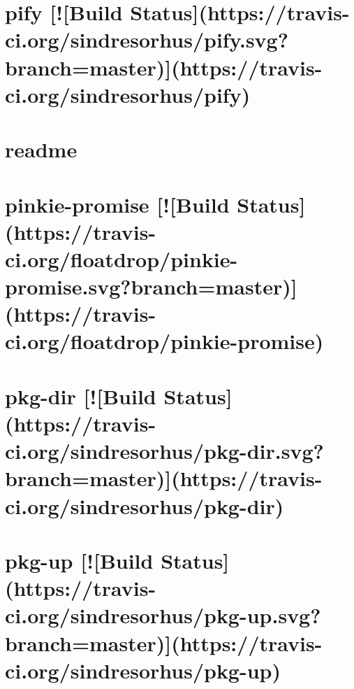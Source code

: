 \documentclass[twoside]{book}
\newcommand{\+}{\discretionary{\mbox{\scriptsize$\hookleftarrow$}}{}{}}
\begin{document}
\chapter{pify \mbox{[}!\mbox{[}Build Status\mbox{]}(https\+://travis-\/ci.org/sindresorhus/pify.svg?branch=master)\mbox{]}(https\+://travis-\/ci.org/sindresorhus/pify)}
\label{md__c_1_workspace_demo_src_main_script_node_modules_pify_readme}

\chapter{readme}
\label{md__c_1_workspace_demo_src_main_script_node_modules_pinkie_readme}

\chapter{pinkie-\/promise \mbox{[}!\mbox{[}Build Status\mbox{]}(https\+://travis-\/ci.org/floatdrop/pinkie-\/promise.svg?branch=master)\mbox{]}(https\+://travis-\/ci.org/floatdrop/pinkie-\/promise)}
\label{md__c_1_workspace_demo_src_main_script_node_modules_pinkie-promise_readme}

\chapter{pkg-\/dir \mbox{[}!\mbox{[}Build Status\mbox{]}(https\+://travis-\/ci.org/sindresorhus/pkg-\/dir.svg?branch=master)\mbox{]}(https\+://travis-\/ci.org/sindresorhus/pkg-\/dir)}
\label{md__c_1_workspace_demo_src_main_script_node_modules_pkg-dir_readme}

\chapter{pkg-\/up \mbox{[}!\mbox{[}Build Status\mbox{]}(https\+://travis-\/ci.org/sindresorhus/pkg-\/up.svg?branch=master)\mbox{]}(https\+://travis-\/ci.org/sindresorhus/pkg-\/up)}
\label{md__c_1_workspace_demo_src_main_script_node_modules_pkg-up_readme}

\end{document}
